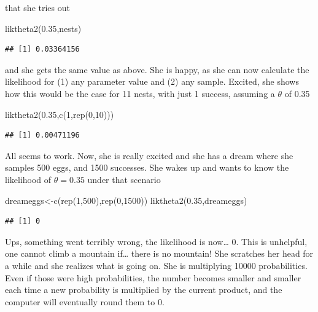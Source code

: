 \documentclass[
]{book}
\newenvironment{Shaded}{\begin{snugshade}}{\end{snugshade}}
\newcommand{\DecValTok}[1]{\textcolor[rgb]{0.00,0.00,0.81}{#1}}
\newcommand{\FloatTok}[1]{\textcolor[rgb]{0.00,0.00,0.81}{#1}}
\newcommand{\FunctionTok}[1]{\textcolor[rgb]{0.00,0.00,0.00}{#1}}
\newcommand{\NormalTok}[1]{#1}
\newcommand{\OtherTok}[1]{\textcolor[rgb]{0.56,0.35,0.01}{#1}}
\begin{document}
that she tries out

\begin{Shaded}
\begin{Highlighting}[]
\FunctionTok{liktheta2}\NormalTok{(}\FloatTok{0.35}\NormalTok{,nests)}
\end{Highlighting}
\end{Shaded}

\begin{verbatim}
## [1] 0.03364156
\end{verbatim}

and she gets the same value as above. She is happy, as she can now calculate the likelihood for (1) any parameter value and (2) any sample. Excited, she shows how this would be the case for 11 nests, with just 1 success, assuming a \(\theta\) of 0.35

\begin{Shaded}
\begin{Highlighting}[]
\FunctionTok{liktheta2}\NormalTok{(}\FloatTok{0.35}\NormalTok{,}\FunctionTok{c}\NormalTok{(}\DecValTok{1}\NormalTok{,}\FunctionTok{rep}\NormalTok{(}\DecValTok{0}\NormalTok{,}\DecValTok{10}\NormalTok{)))}
\end{Highlighting}
\end{Shaded}

\begin{verbatim}
## [1] 0.00471196
\end{verbatim}

All seems to work. Now, she is really excited and she has a dream where she samples 500 eggs, and 1500 successes. She wakes up and wants to know the likelihood of \(\theta=0.35\) under that scenario

\begin{Shaded}
\begin{Highlighting}[]
\NormalTok{dreameggs}\OtherTok{\textless{}{-}}\FunctionTok{c}\NormalTok{(}\FunctionTok{rep}\NormalTok{(}\DecValTok{1}\NormalTok{,}\DecValTok{500}\NormalTok{),}\FunctionTok{rep}\NormalTok{(}\DecValTok{0}\NormalTok{,}\DecValTok{1500}\NormalTok{))}
\FunctionTok{liktheta2}\NormalTok{(}\FloatTok{0.35}\NormalTok{,dreameggs)}
\end{Highlighting}
\end{Shaded}

\begin{verbatim}
## [1] 0
\end{verbatim}

Ups, something went terribly wrong, the likelihood is now\ldots{} 0. This is unhelpful, one cannot climb a mountain if\ldots{} there is no mountain! She scratches her head for a while and she realizes what is going on. She is multiplying 10000 probabilities. Even if those were high probabilities, the number becomes smaller and smaller each time a new probability is multiplied by the current product, and the computer will eventually round them to 0.
\end{document}

